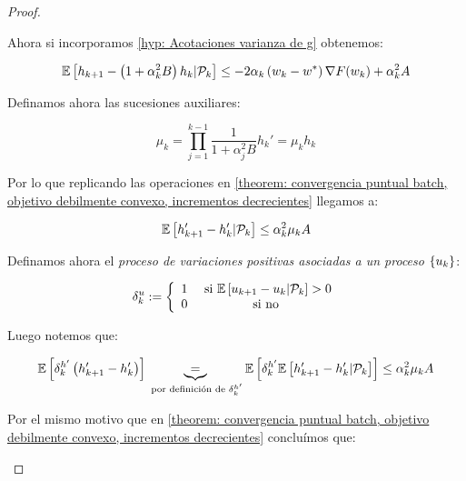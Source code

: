 \begin{proof}
\begin{enumerate}
		Ahora si incorporamos \ref{hyp: Acotaciones varianza de g} obtenemos:
		
		\begin{equation}
			\label{eq: variaciones proceso lyapunov}
				\mathbb{E} \left[{h_{k+1} - \left(1 + \alpha_k^2 B\right)h_k } \vert \mathcal{P}_{k}\right] \leq  -2 \alpha_k \left(w_k - w^*\right) \nabla F(w_k) + \alpha_k^2 A
		\end{equation}
		
		Definamos ahora las sucesiones auxiliares:
		
		\begin{subequations}
			\begin{equation}
			\mu_k = \prod\limits_{j=1}^{k-1} {\dfrac{1}{1 + \alpha_j^2B}}
			\end{equation}
			\begin{equation}
			h_k' = \mu_k h_k
			\end{equation}
		\end{subequations}
	
		Por lo que replicando las operaciones en \ref{theorem: convergencia puntual batch, objetivo debilmente convexo, incrementos decrecientes} llegamos a:
		
		\begin{equation*}
			\mathbb{E} \left[{h_{k+1}' - h_k' } \vert \mathcal{P}_{k}\right] \leq \alpha_k^2 \mu_k A 
		\end{equation*}
		
		Definamos ahora el \textit{proceso de variaciones positivas asociadas a un proceso $\left\lbrace u_k\right\rbrace$}:
		
		\begin{equation}
			\delta^u_k := \left\lbrace \begin{array}{cc}
			1 & \text{ si } \mathbb{E} \left[{u_{k+1} - u_k} \vert \mathcal{P}_{k}\right] > 0 \\
			0 & \text{ si no }
			\end{array}\right.
		\end{equation}
		
		Luego notemos que:
		
		\begin{equation*}
			\mathbb{E} \left[\delta_k^{h'} \left(h_{k+1}' - h_k'\right)\right] \underbrace{=}_{\text{ por definici\'on de } \delta_k^{h'}} \mathbb{E} \left[\delta_k^{h'} \mathbb{E} \left[{h_{k+1}' - h_k'} \vert \mathcal{P}_{k}\right]\right] \leq  \alpha_k^2 \mu_k A
		\end{equation*}
		
		Por el mismo motivo que en \ref{theorem: convergencia puntual batch, objetivo debilmente convexo, incrementos decrecientes} conclu\'imos que:
		

\end{enumerate}
\end{proof}
